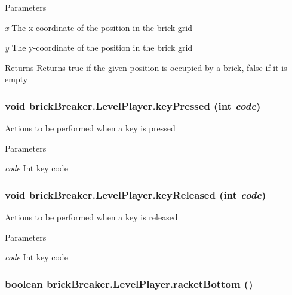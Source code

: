 \begin{DoxyParams}{Parameters}
\item[{\em x}]The x-\/coordinate of the position in the brick grid \item[{\em y}]The y-\/coordinate of the position in the brick grid \end{DoxyParams}
\begin{DoxyReturn}{Returns}
Returns true if the given position is occupied by a brick, false if it is empty 
\end{DoxyReturn}
\hypertarget{classbrick_breaker_1_1_level_player_a1ebfab24bc0e7e7e6851f7856e486d8d}{
\subsubsection[{keyPressed}]{\setlength{\rightskip}{0pt plus 5cm}void brickBreaker.LevelPlayer.keyPressed (int {\em code})}}
\label{classbrick_breaker_1_1_level_player_a1ebfab24bc0e7e7e6851f7856e486d8d}
Actions to be performed when a key is pressed 
\begin{DoxyParams}{Parameters}
\item[{\em code}]Int key code \end{DoxyParams}
\hypertarget{classbrick_breaker_1_1_level_player_a32dd9508bac5135b7f2706b807ada71e}{
\subsubsection[{keyReleased}]{\setlength{\rightskip}{0pt plus 5cm}void brickBreaker.LevelPlayer.keyReleased (int {\em code})}}
\label{classbrick_breaker_1_1_level_player_a32dd9508bac5135b7f2706b807ada71e}
Actions to be performed when a key is released 
\begin{DoxyParams}{Parameters}
\item[{\em code}]Int key code \end{DoxyParams}
\hypertarget{classbrick_breaker_1_1_level_player_a6a7980415c6fed32a9f6c9271bae6220}{
\subsubsection[{racketBottom}]{\setlength{\rightskip}{0pt plus 5cm}boolean brickBreaker.LevelPlayer.racketBottom ()}}
